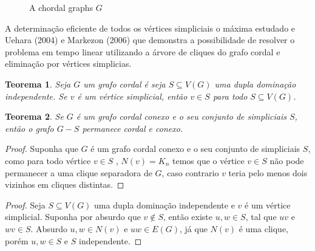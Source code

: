 \documentclass[a4paper,8pt]{article}
\theoremstyle{plain}
\newtheorem{theorem}{Teorema}[section]
\begin{document}
\begin{figure}[h]
        \caption{A chordal graphs $G$} 
        
    
        \label{fig:my_label1}
\end{figure}


A  determinação  eficiente  de  todos  os  vértices  simpliciais  o  máxima  estudado  e Uehara  (2004) e Markezon (2006) que demonstra a possibilidade de resolver o problema em tempo linear utilizando a árvore de cliques do grafo cordal e eliminação por vértices simplicias. 











\begin{theorem}
 Seja $G$ um grafo cordal é seja $S\subseteq V(G)$ uma dupla dominação independente. Se $v$ é um vértice simplicial, então $v \in S$ para todo $S\subseteq V(G)$.
\end{theorem}

\begin{theorem}
 Se  $G$ é um grafo cordal conexo  e o seu conjunto de simpliciais $S$, então o grafo $G-S$ permanece cordal e conexo.
\end{theorem}

\begin{proof}
Suponha que $G$ é um grafo cordal conexo  e o seu conjunto de simpliciais $S$, como para todo vértice $v \in S$ , $N(v)=K_n$ temos que o vértice $v \in S$ não pode permanecer a uma clique separadora de $G$, caso contrario $v$ teria pelo menos dois vizinhos em cliques distintas.
\end{proof}



\begin{proof}\label{teocordal}  
  Seja $S\subseteq V(G)$ uma dupla dominação independente e
  $v$ é um vértice simplicial. Suponha por absurdo que $v \notin S$, então existe $u,w \in S$, tal que $uv$ e $wv \in S$. Absurdo $u,w \in N(v)$ e $uw \in E(G)$, já que $N(v)$ é uma clique, porém $u,w \in S$ e $S$ independente.
\end{proof}
\end{document}
